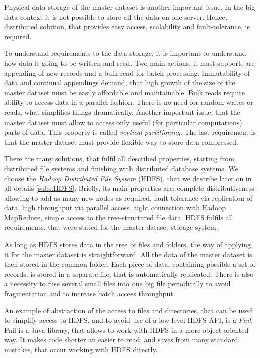 Physical data storage of the master dataset is another important issue.
In the big data context it is not possible to store all the data on one server.
Hence, distributed solution, that provides easy access, scalability and fault-tolerance, is required. 

To understand requirements to the data storage, it is important to understand how data is going to be written and read.
Two main actions, it must support, are appending of new records and a bulk read for batch processing.
Immutability of data and continual appendings demand, that high growth of the size of the master dataset must be easily affordable and maintainable.
Bulk reads require ability to access data in a parallel fashion.
There is no need for random writes or reads, what simplifies things dramatically.
Another important issue, that the master dataset must allow to access only useful (for particular computations) parts of data.
This property is called \textit{vertical partitioning}.
The last requirement is that the master dataset must provide flexible way to store data compressed.

There are many solutions, that fulfil all described properties, starting from distributed file systems and finishing with distributed database systems. 
We choose the \textit{Hadoop Distributed File System} (HDFS), that we describe later on in all details \ref{subs:HDFS}.
Briefly, its main properties are: complete distributiveness allowing to add as many new nodes as required, fault-tolerance via replication of data, high throughput via parallel access, tight connection with Hadoop MapReduce, simple access to the tree-structured file data.
HDFS fulfils all requirements, that were stated for the master dataset storage system.

As long as HDFS stores data in the tree of files and folders, the way of applying it for the master dataset is straightforward.
All the data of the master dataset is then stored in the common folder.
Each piece of data, containing possible a set of records, is stored in a separate file, that is automatically replicated.
There is also a necessity to fuse several small files into one big file periodically to avoid fragmentation and to increase batch access throughput.

An example of abstraction of the access to files and directories, that can be used to simplify access to HDFS, and to avoid use of a low-level HDFS API, is a \textit{Pail}.
Pail is a Java library, that allows to work with HDFS in a more object-oriented way.
It makes code shorter an easier to read, and saves from many standard mistakes, that occur working with HDFS directly.

